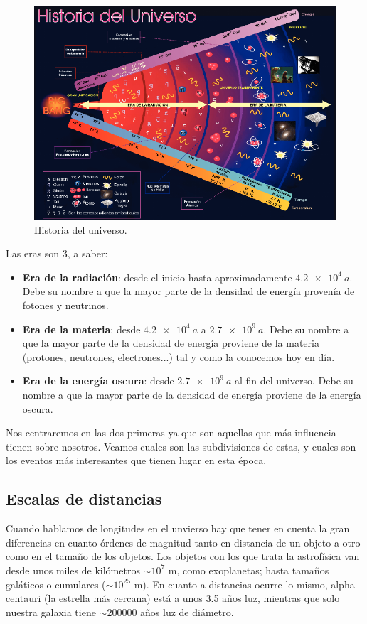 \begin{figure}[h!] \centering
    \includegraphics[width=1\linewidth]{Cuerpo/Ch_03/01_Universo.png}
    \caption{Historia del universo.}
\end{figure}
Las eras son 3, a saber:
\begin{itemize}
    \item \textbf{Era de la radiación}: desde el inicio hasta aproximadamente $\SI{4.2e4}{a}$. Debe su nombre a que la mayor parte de la densidad de energía provenía de fotones y neutrinos. 
    \item \textbf{Era de la materia}: desde $\SI{4.2e4}{a}$ a $\SI{2.7e9}{a}$. Debe su nombre a que la mayor parte de la densidad de energía proviene de la materia (protones, neutrones, electrones...) tal y como la conocemos hoy en día.
    \item \textbf{Era de la energía oscura}: desde $\SI{2.7e9}{a}$ al fin del universo. Debe su nombre a que la mayor parte de la densidad de energía proviene de la energía oscura.
\end{itemize}
Nos centraremos en las dos primeras ya que son aquellas que más influencia tienen sobre nosotros. Veamos cuales son las subdivisiones de estas, y cuales son los eventos más interesantes que tienen lugar en esta época. 


\subsection{Escalas de distancias}

Cuando hablamos de longitudes en el unvierso hay que tener en cuenta la gran diferencias en cuanto órdenes de magnitud tanto en distancia de un objeto a otro como en el tamaño de  los objetos. Los objetos con los que trata la astrofísica van desde unos miles de kilómetros $\sim 10^{7}$ m, como exoplanetas; hasta tamaños galáticos o cumulares ($\sim 10^{25}$ m). En cuanto a distancias ocurre lo mismo, alpha centauri (la estrella más cercana) está a unos 3.5 años luz, mientras que solo nuestra galaxia tiene $\sim$200000 años luz de diámetro. 

